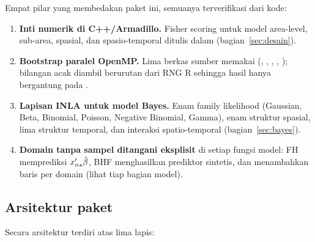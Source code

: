 Empat pilar yang membedakan paket ini, semuanya terverifikasi dari kode:

\begin{enumerate}[label=\arabic*.]
  \item \textbf{Inti numerik di C++/Armadillo.} Fisher scoring untuk model
        area-level, sub-area, spasial, dan spasio-temporal ditulis dalam
         (bagian~\ref{sec:desain}).
  \item \textbf{Bootstrap paralel OpenMP.} Lima berkas sumber memakai
        (, ,
        , ,
        ); bilangan acak diambil berurutan dari
        RNG R sehingga hasil hanya bergantung pada .
  \item \textbf{Lapisan INLA untuk model Bayes.} Enam family likelihood
        (Gaussian, Beta, Binomial, Poisson, Negative Binomial, Gamma), enam
        struktur spasial, lima struktur temporal, dan interaksi
        spatio-temporal (bagian~\ref{sec:bayes}).
  \item \textbf{Domain tanpa sampel ditangani eksplisit} di setiap fungsi
        model: FH memprediksi $x_{ns}'\hat\beta$, BHF menghasilkan prediktor
        sintetis, dan  menambahkan baris  per
        domain (lihat tiap bagian model).
\end{enumerate}

\subsection{Arsitektur paket}\label{sec:arsitektur}

Secara arsitektur  terdiri atas lima lapis:


